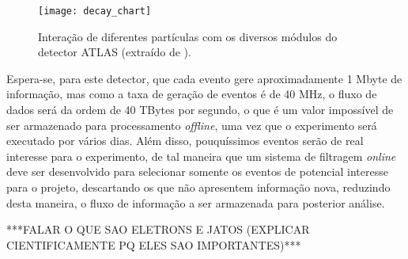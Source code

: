 \begin{figure}
\begin{center}
\texttt{[image: decay\_chart]}
\caption[Interação de diferentes partículas com os diversos módulos do detector ATLAS.]{Interação de diferentes partículas com os diversos módulos do detector ATLAS (extraído de \cite{bib:site_atlas}).}
\label{FIG:INTERACAO_PARTICULAS_ATLAS}
\end{center}
\end{figure}


Espera-se, para este detector, que cada evento gere aproximadamente 1 Mbyte de informação, mas como a taxa de geração de eventos é de 40 MHz, o fluxo de dados será da ordem de 40 TBytes por segundo, o que é um valor impossível de ser armazenado para processamento \emph{offline}, uma vez que o experimento será executado por vários dias. Além disso, pouquíssimos eventos serão de real interesse para o experimento, de tal maneira que um sistema de filtragem \emph{online} deve ser desenvolvido para selecionar somente os eventos de potencial interesse para o projeto, descartando os que não apresentem informação nova, reduzindo desta maneira, o fluxo de informação a ser armazenada para posterior análise.


\huge
***FALAR O QUE SAO ELETRONS E JATOS (EXPLICAR CIENTIFICAMENTE PQ ELES SAO IMPORTANTES)***
\normalsize

